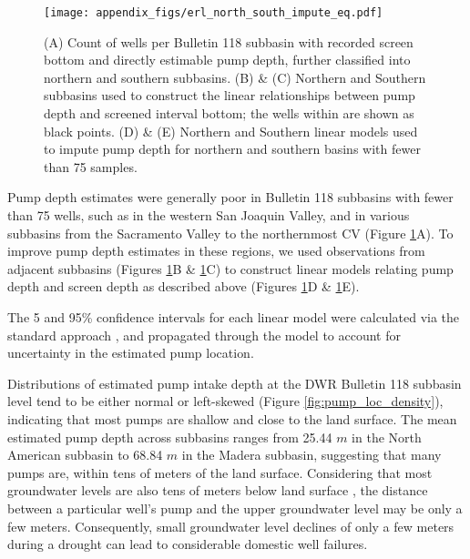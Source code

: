\begin{figure}[ht]
	\texttt{[image: appendix\_figs/erl\_north\_south\_impute\_eq.pdf]}
	\caption{(A) Count of wells per Bulletin 118 subbasin with recorded screen bottom and directly estimable pump depth, further classified into northern and southern subbasins. (B) \& (C) Northern and Southern subbasins used to construct the linear relationships between pump depth and screened interval bottom; the wells within are shown as black points. (D) \& (E) Northern and Southern linear models used to impute pump depth for northern and southern basins with fewer than 75 samples.}
	\label{fig:north_south_impute}
\end{figure}

Pump depth estimates were generally poor in Bulletin 118 subbasins with fewer than 75 wells, such as in the western San Joaquin Valley, and in various subbasins from the Sacramento Valley to the northernmost CV (Figure \ref{fig:north_south_impute}A). To improve pump depth estimates in these regions, we used observations from adjacent subbasins (Figures \ref{fig:north_south_impute}B \&  \ref{fig:north_south_impute}C) to construct linear models relating pump depth and screen depth as described above (Figures \ref{fig:north_south_impute}D \&  \ref{fig:north_south_impute}E).  

The 5 and 95\% confidence intervals for each linear model were calculated via the standard approach \cite{james2013introduction}, and propagated through the model to account for uncertainty in the estimated pump location.   


Distributions of estimated pump intake depth at the DWR Bulletin 118 subbasin level tend to be either normal or left-skewed (Figure \ref{fig:pump_loc_density}), indicating that most pumps are shallow and close to the land surface. The mean estimated pump depth across subbasins ranges from 25.44 $m$ in the North American subbasin to 68.84 $m$ in the Madera subbasin, suggesting that many pumps are, within tens of meters of the land surface. Considering that most groundwater levels are also tens of meters below land surface %
, the distance between a particular well's pump and the upper groundwater level may be only a few meters. Consequently, small groundwater level declines of only a few meters during a drought can lead to considerable domestic well failures.  


